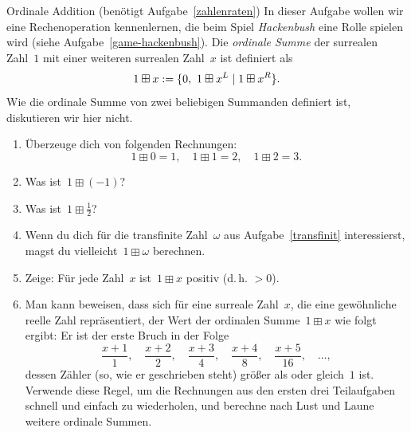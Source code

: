 \documentclass{../zirkelblatt}
\begin{document}
\begin{aufgabe}{Ordinale Addition (benötigt Aufgabe~\ref{zahlenraten})}
\label{ordinale-addition}
In dieser Aufgabe wollen wir eine Rechenoperation
kennenlernen, die beim Spiel \emph{Hackenbush} eine Rolle spielen wird (siehe
Aufgabe~\ref{game-hackenbush}). Die \emph{ordinale Summe} der surrealen Zahl~$1$ mit
einer weiteren surrealen Zahl~$x$ ist definiert als
\[ 1 \boxplus x := \sur{0,\ 1 \boxplus x^L}{1 \boxplus x^R}. \]
Wie die ordinale Summe von zwei beliebigen Summanden definiert ist,
diskutieren wir hier nicht.
\begin{enumerate}
\item Überzeuge dich von folgenden Rechnungen:
\[ 1 \boxplus 0 = 1, \quad
  1 \boxplus 1 = 2, \quad
  1 \boxplus 2 = 3. \]
\item Was ist~$1 \boxplus (-1)$?
\item Was ist~$1 \boxplus \tfrac{1}{2}$?
\item Wenn du dich für die transfinite Zahl~$\omega$ aus
Aufgabe~\ref{transfinit} interessierst, magst du vielleicht~$1 \boxplus \omega$
berechnen.
\item Zeige: Für jede Zahl~$x$ ist~$1 \boxplus x$ positiv (d.\,h. $> 0$).
\item Man kann beweisen, dass sich für eine surreale Zahl~$x$, die eine gewöhnliche
reelle Zahl repräsentiert, der Wert der ordinalen Summe~$1 \boxplus x$ wie
folgt ergibt: Er ist der erste Bruch in der Folge
\[ \frac{x+1}{1}, \quad
  \frac{x+2}{2}, \quad
  \frac{x+3}{4}, \quad
  \frac{x+4}{8}, \quad
  \frac{x+5}{16}, \quad \ldots, \]
dessen Zähler (so, wie er geschrieben steht) größer als oder gleich~$1$ ist. Verwende diese
Regel, um die Rechnungen aus den ersten drei Teilaufgaben schnell und einfach
zu wiederholen, und berechne nach Lust und Laune weitere ordinale Summen.
\end{enumerate}
\end{aufgabe}
\end{document}
